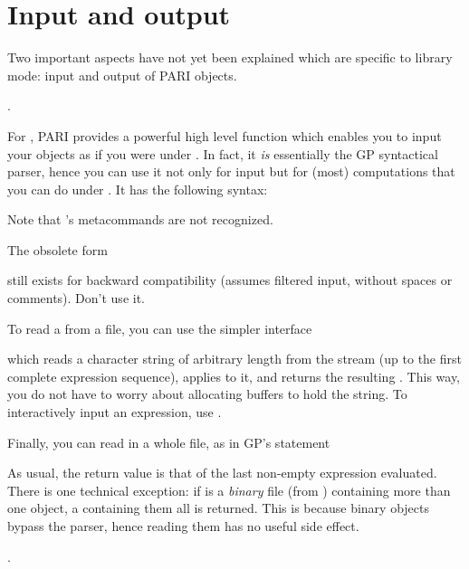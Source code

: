 \section{Input and output}

\noindent
Two important aspects have not yet been explained which are specific to
library mode: input and output of PARI objects.

.

\noindent
For , PARI provides a powerful high level function
which enables you to input your objects as if you were under . In fact,
it \emph{is} essentially the GP syntactical parser, hence you can use it not
only for input but for (most) computations that you can do under .
It has the following syntax:\label{se:gp_read_str}


\noindent
Note that 's metacommands are not recognized.

 The obsolete form


still exists for backward compatibility (assumes filtered input, without
spaces or comments). Don't use it.

To read a  from a file, you can use the simpler interface


\noindent which reads a character string of arbitrary length from the stream
 (up to the first complete expression sequence), applies
 to it, and returns the resulting . This way, you
do not have to worry about allocating buffers to hold the string. To
interactively input an expression, use .

Finally, you can read in a whole file, as in GP's  statement


\noindent As usual, the return value is that of the last non-empty expression
evaluated. There is one technical exception: if  is a \emph{binary}
file (from ) containing more than one object, a 
containing them all is returned. This is because binary objects bypass the
parser, hence reading them has no useful side effect.

.

